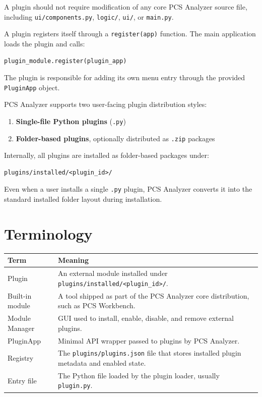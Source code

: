 \documentclass[11pt, a4paper]{article}
\begin{document}
A plugin should not require modification of any core PCS Analyzer source file, including \texttt{ui/components.py}, \texttt{logic/}, \texttt{ui/}, or \texttt{main.py}.

A plugin registers itself through a \texttt{register(app)} function. The main application loads the plugin and calls:

\begin{lstlisting}[style=python]
plugin_module.register(plugin_app)
\end{lstlisting}

The plugin is responsible for adding its own menu entry through the provided \texttt{PluginApp} object.

PCS Analyzer supports two user-facing plugin distribution styles:
\begin{enumerate}
  \item \textbf{Single-file Python plugins} (\texttt{.py})
  \item \textbf{Folder-based plugins}, optionally distributed as \texttt{.zip} packages
\end{enumerate}

Internally, all plugins are installed as folder-based packages under:
\begin{lstlisting}[style=text]
plugins/installed/<plugin_id>/
\end{lstlisting}

Even when a user installs a single \texttt{.py} plugin, PCS Analyzer converts it into the standard installed folder layout during installation.

\section{Terminology}

\begin{tabularx}{\linewidth}{@{}M{3.6cm}L@{}}
  \toprule
  \textbf{Term} & \textbf{Meaning} \\
  \midrule
  Plugin & An external module installed under \texttt{plugins/installed/<plugin\_id>/}. \\
  Built-in module & A tool shipped as part of the PCS Analyzer core distribution, such as PCS Workbench. \\
  Module Manager & GUI used to install, enable, disable, and remove external plugins. \\
  PluginApp & Minimal API wrapper passed to plugins by PCS Analyzer. \\
  Registry & The \texttt{plugins/plugins.json} file that stores installed plugin metadata and enabled state. \\
  Entry file & The Python file loaded by the plugin loader, usually \texttt{plugin.py}. \\
  \bottomrule
\end{tabularx}
\end{document}
